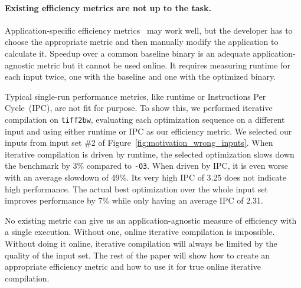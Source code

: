     \paragraph{Existing efficiency metrics are not up to the task.} Application-specific efficiency metrics~\cite{alameldeen06,coppa14} may
    work well, but the developer has to choose the appropriate metric and then manually modify the application to calculate it. Speedup
    over a common baseline binary is an adequate application-agnostic metric but it cannot be used online. It requires measuring runtime
    for each input twice, one with the baseline and one with the optimized binary.

    Typical single-run performance metrics, like runtime or Instructions Per Cycle~(IPC), are not fit for purpose. To show this, we
    performed iterative compilation on \texttt{tiff2bw}, evaluating each optimization sequence on a different input and using either
    runtime or IPC as our efficiency metric. We selected our inputs from input set \#2 of Figure~\ref{fig:motivation_wrong_inputs}. When
    iterative compilation is driven by runtime, the selected optimization slows down the benchmark by 3\% compared to \texttt{-O3}. When
    driven by IPC, it is even worse with an average slowdown of 49\%. Its very high IPC of 3.25 does not indicate high performance. The
    actual best optimization over the whole input set improves performance by 7\% while only having an average IPC of 2.31.

    No existing metric can give us an application-agnostic measure of efficiency with a single execution. Without one, online iterative
    compilation is impossible. Without doing it online, iterative compilation will always be limited by the quality of the input set.
    The rest of the paper will show how to create an appropriate efficiency metric and how to use it for true online iterative
    compilation. 

